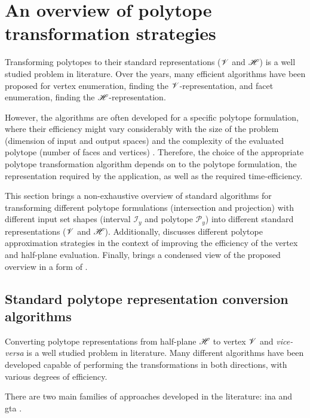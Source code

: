 \section{An overview of polytope transformation strategies} 
\label{ch:polytope_algorithms}

Transforming polytopes to their standard representations ($\mathscr{V}$ and $\mathscr{H}$) is a well studied problem in literature. Over the years, many efficient algorithms  \cite{bremner_fukuda_marzetta_1998,fukuda_dd,avis_pivoting_nodate} have been proposed for vertex enumeration, finding the $\mathscr{V}$-representation, and facet enumeration, finding the $\mathscr{H}$-representation. 

However, the algorithms are often developed for a specific polytope formulation, where their efficiency might vary considerably with the size of the problem (dimension of input and output spaces) \cite{avis_comparative_2015} and the complexity of the evaluated polytope (number of faces and vertices) \cite{Dyer1983}. Therefore, the choice of the appropriate polytope transformation algorithm depends on to the polytope formulation, the representation required by the application, as well as the required time-efficiency.

This section brings a non-exhaustive overview of standard algorithms for transforming different polytope formulations (intersection and projection) with different input set shapes (interval $\mathcal{I}_y$ and polytope $\mathcal{P}_y$) into different standard representations ($\mathscr{V}$ and $\mathscr{H}$). Additionally,  discusses different polytope approximation strategies in the context of improving the efficiency of the vertex and half-plane evaluation. Finally,  brings a condensed view of the proposed overview in a form of .

\subsection{Standard polytope representation conversion algorithms}
\label{ch:standard_represtantion_conversion}

Converting polytope representations from half-plane $\mathscr{H}$ to vertex $\mathscr{V}$ and \textit{vice-versa} is a well studied problem in literature. Many different algorithms have been developed capable of performing the transformations in both directions, with various degrees of efficiency. 

There are two main families of approaches developed in the literature: \gls{ina} and \gls{gta} \cite[Chapter 8.]{fukuda2016lecture} \cite{avis1997how}.

